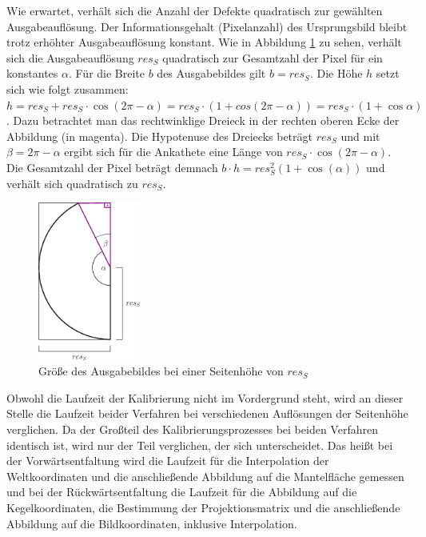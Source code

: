 Wie erwartet, verhält sich die Anzahl der Defekte quadratisch zur gewählten Ausgabeauflösung. Der Informationsgehalt (Pixelanzahl) des Ursprungsbild bleibt trotz erhöhter Ausgabeauflösung konstant. Wie in Abbildung \ref{fig:sizeOutput} zu sehen, verhält sich die Ausgabeauflösung $res_S$ quadratisch zur Gesamtzahl der Pixel für ein konstantes $\alpha$. Für die Breite $b$ des Ausgabebildes gilt $b = res_S$.
Die Höhe $h$ setzt sich wie folgt zusammen: $h = res_S + res_S\cdot\cos(2\pi-\alpha) = res_S\cdot(1 + cos(2\pi-\alpha)) = res_S\cdot(1+\cos\alpha)$. Dazu betrachtet man das rechtwinklige Dreieck in der rechten oberen Ecke der Abbildung (in magenta). Die Hypotenuse des Dreiecks beträgt $res_S$ und mit $\beta = 2\pi - \alpha$ ergibt sich für die Ankathete eine Länge von $res_S\cdot\cos(2\pi-\alpha)$. Die Gesamtzahl der Pixel beträgt demnach $b\cdot h = res_S^2(1+\cos(\alpha))$ und verhält sich quadratisch zu $res_S$.

\begin{figure}[!htb]
	\centering
	\includegraphics[width=0.3\textwidth]{images/sizeOutput.eps}
	\caption{Größe des Ausgabebildes bei einer Seitenhöhe von $res_S$}
	\label{fig:sizeOutput}
\end{figure}


Obwohl die Laufzeit der Kalibrierung nicht im Vordergrund steht, wird an dieser Stelle die Laufzeit beider Verfahren bei verschiedenen Auflösungen der Seitenhöhe verglichen. Da der Großteil des Kalibrierungsprozesses bei beiden Verfahren identisch ist, wird nur der Teil verglichen, der sich unterscheidet. Das heißt bei der Vorwärtsentfaltung wird die Laufzeit für die Interpolation der Weltkoordinaten und die anschließende Abbildung auf die Mantelfläche gemessen und bei der Rückwärtsentfaltung die Laufzeit für die Abbildung auf die Kegelkoordinaten, die Bestimmung der Projektionsmatrix und die anschließende Abbildung auf die Bildkoordinaten, inklusive Interpolation.


